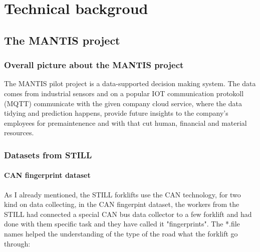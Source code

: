 \chapter{Technical backgroud}
	\section{The MANTIS project}
		\subsection{Overall picture about the MANTIS project}
The MANTIS pilot project is a data-supported decision making system. The data comes from industrial sensors and on a popular IOT communication protokoll (MQTT) communicate with the given company cloud service, where the data tidying and prediction happens, provide future insights to the company's employees for premaintenence and with that cut human, financial and material resources.

		\subsection{Datasets from STILL}
			\subsubsection{CAN fingerprint dataset}
				\noindent
As I already mentioned, the STILL forklifts use the CAN technology, for two kind on data collecting, in the CAN fingerpint dataset, the workers from the STILL had  connected a special CAN bus data collector to a few forklift and had done with them specific task and they have called it "fingerprints". The *.file names helped the understanding of the type of the road what the forklift go through:

